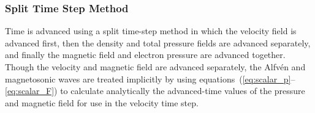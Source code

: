 \subsubsection{Split Time Step Method}



Time is advanced using a split time-step method in which the velocity
field is advanced first, then the density and total pressure fields
are advanced separately, and finally the magnetic field and electron
pressure are advanced together.  Though the velocity and magnetic
field are advanced separately, the Alfv\'en and magnetosonic waves are
treated implicitly by using
equations~(\ref{eq:scalar_p}--\ref{eq:scalar_F}) to calculate
analytically the advanced-time values of the pressure and magnetic
field for use in the velocity time step.




